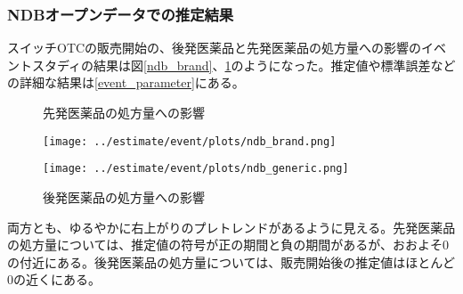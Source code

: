 \documentclass[a4paper,11pt,uplatex]{jsarticle}
\theoremstyle{definition}
\begin{document}
\subsubsection{NDBオープンデータでの推定結果}
スイッチOTCの販売開始の、後発医薬品と先発医薬品の処方量への影響のイベントスタディの結果は図\ref{ndb_brand}、\ref{ndb_generic}のようになった。推定値や標準誤差などの詳細な結果は\ref{event_parameter}にある。
\begin{figure}[H]
    \centering
    \begin{minipage}{0.45\textwidth}
        \caption{先発医薬品の処方量への影響}\label{ndb_brand}
        \centering
        \texttt{[image: ../estimate/event/plots/ndb\_brand.png]}
    \end{minipage}\hfill
    \begin{minipage}{0.45\textwidth}
        \caption{後発医薬品の処方量への影響}\label{ndb_generic}
        \centering
        \texttt{[image: ../estimate/event/plots/ndb\_generic.png]}
    \end{minipage}
\end{figure}
両方とも、ゆるやかに右上がりのプレトレンドがあるように見える。先発医薬品の処方量については、推定値の符号が正の期間と負の期間があるが、おおよそ0の付近にある。後発医薬品の処方量については、販売開始後の推定値はほとんど0の近くにある。
\end{document}

